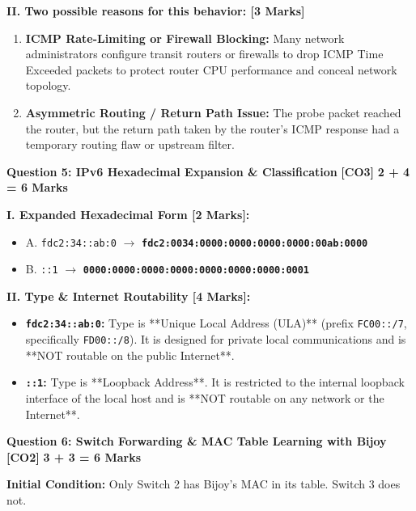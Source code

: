 \documentclass[11pt,a4paper]{article}
\newcommand{\questionheader}[3]{
    \vspace{0.35cm}
    \noindent\colorbox{qboxbg}{
        \parbox{\dimexpr\textwidth-2\fboxsep\relax}{
            \textbf{\textcolor{primary}{\large #1}} \hfill \textbf{\textcolor{accent}{[#2]}} \hfill \textbf{\textcolor{secondary}{#3 Marks}}
        }
    }
    \vspace{0.15cm}
}
\begin{document}
\textbf{II. Two possible reasons for this behavior: [3 Marks]}
\begin{enumerate}
    \item \textbf{ICMP Rate-Limiting or Firewall Blocking:} Many network administrators configure transit routers or firewalls to drop ICMP Time Exceeded packets to protect router CPU performance and conceal network topology.
    \item \textbf{Asymmetric Routing / Return Path Issue:} The probe packet reached the router, but the return path taken by the router's ICMP response had a temporary routing flaw or upstream filter.
\end{enumerate}

\questionheader{Question 5: IPv6 Hexadecimal Expansion \& Classification}{CO3}{2 + 4 = 6}

\textbf{I. Expanded Hexadecimal Form [2 Marks]:}
\begin{itemize}
    \item A. \texttt{fdc2:34::ab:0} $\to$ \textbf{\texttt{fdc2:0034:0000:0000:0000:0000:00ab:0000}}
    \item B. \texttt{::1} $\to$ \textbf{\texttt{0000:0000:0000:0000:0000:0000:0000:0001}}
\end{itemize}

\textbf{II. Type \& Internet Routability [4 Marks]:}
\begin{itemize}
    \item \textbf{\texttt{fdc2:34::ab:0}:} Type is **Unique Local Address (ULA)** (prefix \texttt{FC00::/7}, specifically \texttt{FD00::/8}). It is designed for private local communications and is **NOT routable on the public Internet**.
    \item \textbf{\texttt{::1}:} Type is **Loopback Address**. It is restricted to the internal loopback interface of the local host and is **NOT routable on any network or the Internet**.
\end{itemize}

\questionheader{Question 6: Switch Forwarding \& MAC Table Learning with Bijoy}{CO2}{3 + 3 = 6}

\textbf{Initial Condition:} Only Switch 2 has Bijoy's MAC in its table. Switch 3 does not.
\end{document}
